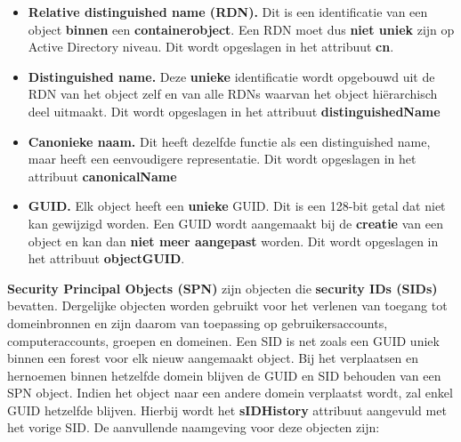 \documentclass{report}
\begin{document}
	\begin{enumerate}
		{ 
			\begin{itemize}
				\item \textbf{Relative distinguished name (RDN).} Dit is een identificatie van een object \textbf{binnen} een \textbf{containerobject}. Een RDN moet dus \textbf{niet uniek} zijn op Active Directory niveau. Dit wordt opgeslagen in het attribuut \textbf{cn}.
				
				\item \textbf{Distinguished name.} Deze \textbf{unieke} identificatie wordt opgebouwd uit de RDN van het object zelf en van alle RDNs waarvan het object hiërarchisch deel uitmaakt. Dit wordt opgeslagen in het attribuut \textbf{distinguishedName}
				
				\item \textbf{Canonieke naam.} Dit heeft dezelfde functie als een distinguished name, maar heeft een eenvoudigere representatie. Dit wordt opgeslagen in het attribuut \textbf{canonicalName}
				
				\item \textbf{GUID.} Elk object heeft een \textbf{unieke} GUID. Dit is een 128-bit getal dat niet kan gewijzigd worden. Een GUID wordt aangemaakt bij de \textbf{creatie} van een object en kan dan \textbf{niet meer aangepast} worden. Dit wordt opgeslagen in het attribuut \textbf{objectGUID}.
			\end{itemize}
			
		}	
		 { 
			\textbf{Security Principal Objects (SPN)} zijn objecten die \textbf{security IDs (SIDs)} bevatten. Dergelijke objecten worden gebruikt voor het verlenen van toegang tot domeinbronnen en zijn daarom van toepassing op gebruikersaccounts, computeraccounts, groepen en domeinen. Een SID is net zoals een GUID uniek binnen een forest voor elk nieuw aangemaakt object. Bij het verplaatsen en hernoemen binnen hetzelfde domein blijven de GUID en SID behouden van een SPN object. Indien het object naar een andere domein verplaatst wordt, zal enkel GUID hetzelfde blijven. Hierbij wordt het \textbf{sIDHistory} attribuut aangevuld met het vorige SID.	De aanvullende naamgeving voor deze objecten zijn:

}
\end{enumerate}
\end{document}
